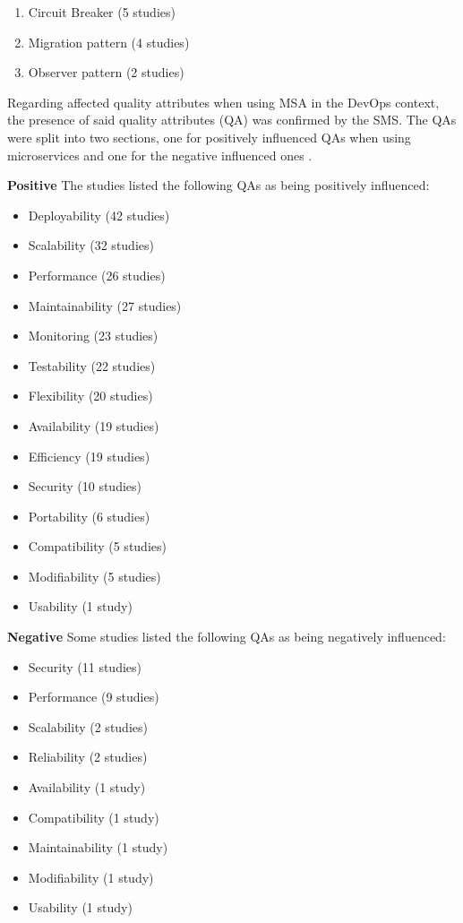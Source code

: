 \begin{enumerate}
    \item Circuit Breaker (5 studies)
    \item Migration pattern (4 studies)
    \item Observer pattern (2 studies)
\end{enumerate}

Regarding affected quality attributes when using MSA in the DevOps context,
the presence of said quality attributes (QA) was confirmed by the SMS.
The QAs were split into two sections, one for positively influenced QAs when
using microservices and one for the negative influenced ones \cite{waseem:SMSMSADevOps}.

\textbf{Positive}
The studies listed the following QAs as being positively influenced:
\begin{itemize}
    \item Deployability (42 studies)
    \item Scalability (32 studies)
    \item Performance (26 studies)
    \item Maintainability (27 studies)
    \item Monitoring (23 studies)
    \item Testability (22 studies)
    \item Flexibility (20 studies)
    \item Availability (19 studies)
    \item Efficiency (19 studies)
    \item Security (10 studies)
    \item Portability (6 studies)
    \item Compatibility (5 studies)
    \item Modifiability (5 studies)
    \item Usability (1 study)
\end{itemize}

\textbf{Negative}
Some studies listed the following QAs as being negatively influenced:
\begin{itemize}
    \item Security (11 studies)
    \item Performance (9 studies)
    \item Scalability (2 studies)
    \item Reliability (2 studies)
    \item Availability (1 study)
    \item Compatibility (1 study)
    \item Maintainability (1 study)
    \item Modifiability (1 study)
    \item Usability (1 study)
\end{itemize}

